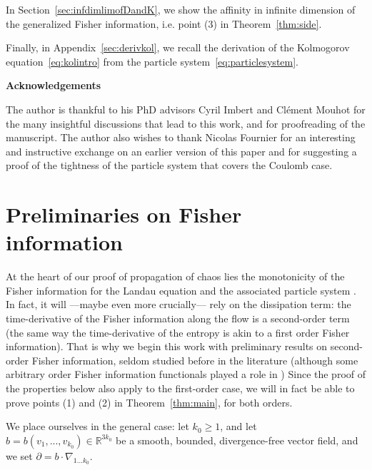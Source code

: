 \documentclass[11pt,a4paper]{article}
\theoremstyle{definition}
\theoremstyle{plain}
\begin{document}
In Section~\ref{sec:infdimlimofDandK}, we show the affinity in infinite dimension of the generalized Fisher information, i.e. point (3) in Theorem~\ref{thm:side}.

Finally, in Appendix~\ref{sec:derivkol}, we recall the derivation of the Kolmogorov equation~\eqref{eq:kolintro} from the particle system~\eqref{eq:particlesystem}. 

\begin{center}
\begin{large}
\textbf{Acknowledgements}
\end{large}
\end{center}

The author is thankful to his PhD advisors Cyril Imbert and Clément Mouhot for the many insightful discussions that lead to this work, and for proofreading of the manuscript. The author also wishes to thank Nicolas Fournier for an interesting and instructive exchange on an earlier version of this paper and for suggesting a proof of the tightness of the particle system that covers the Coulomb case.

\section{Preliminaries on Fisher information}
\label{sec:on the fisher dissipation and aux}

At the heart of our proof of propagation of chaos lies the monotonicity of the Fisher information for the Landau equation and the associated particle system \cite{GuillenSilvestre2023,CarrilloGuo2025}. In fact, it will —maybe even more crucially— rely on the dissipation term: the time-derivative of the Fisher information along the flow is a second-order term (the same way the time-derivative of the entropy is akin to a first order Fisher information). That is why we begin this work with preliminary results on second-order Fisher information, seldom studied before in the literature (although some arbitrary order Fisher information functionals played a role in \cite{LionsToscani1995}) Since the proof of the properties below also apply to the first-order case, we will in fact be able to prove points (1) and (2) in Theorem~\ref{thm:main}, for both orders.

We place ourselves in the general case: let $k_0\geq 1$, and let $b=b(v_1,...,v_{k_0})\in\mathbb{R}^{3k_0}$ be a smooth, bounded, divergence-free vector field, and we set $\partial=b\cdot\nabla_{1...k_0}$.
\end{document}
